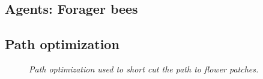 \documentclass[
	paper=128mm:96mm,
	fontsize=11pt,
	pagesize,
	parskip=half-,
]{scrartcl}
\theoremstyle{mythmstyle} %
\begin{document}
\subsection*{Agents: Forager bees}
	
	\clearpage

\subsection*{Path optimization}
	\begin{figure}[H]
		\centering
		\caption{\textit{Path optimization used to short cut the path to flower patches.}}
		\label{fig:pathOptimization}
	\end{figure}
\end{document}
